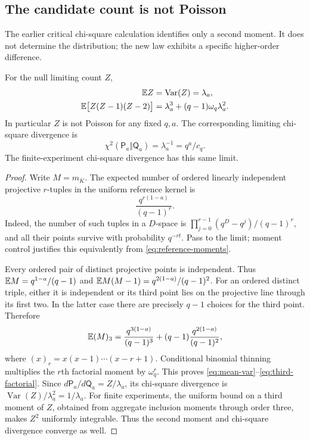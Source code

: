 \subsection{The candidate count is not Poisson}

The earlier critical chi-square calculation identifies only a second
moment. It does not determine the distribution; the new law exhibits a
specific higher-order difference.

\begin{corollary}
\label{cor:not-poisson}
For the null limiting count $Z$,
\begin{align}
 \mathbb E Z&=\operatorname{Var}(Z)=\lambda_a,\label{eq:mean-var}\\
 \mathbb E\bigl[Z(Z-1)(Z-2)\bigr]
 &=\lambda_a^3+(q-1)\omega_q\lambda_a^2.
 \label{eq:third-factorial}
\end{align}
In particular $Z$ is not Poisson for any fixed $q,a$. The corresponding
limiting chi-square divergence is
\begin{equation}
 \chi^2(\mathsf P_a\Vert\mathsf Q_a)=\lambda_a^{-1}=q^a/c_q.
 \label{eq:chi}
\end{equation}
The finite-experiment chi-square divergence has this same limit.
\end{corollary}

\begin{proof}
Write $M=m_K$. The expected number of ordered linearly independent
projective $r$-tuples in the uniform reference kernel is
\begin{equation}
 \frac{q^{r(1-a)}}{(q-1)^r}.
 \label{eq:independent-points}
\end{equation}
Indeed, the number of such tuples in a $D$-space is
$\prod_{j=0}^{r-1}(q^D-q^j)/(q-1)^r$, and all their points survive
with probability $q^{-rt}$. Pass to the limit; moment control justifies
this equivalently from \eqref{eq:reference-moments}.

Every ordered pair of distinct projective points is independent. Thus
$\mathbb E M=q^{1-a}/(q-1)$ and
$\mathbb E M(M-1)=q^{2(1-a)}/(q-1)^2$. For an ordered distinct triple,
either it is independent or its third point lies on the projective line
through its first two. In the latter case there are precisely $q-1$
choices for the third point. Therefore
\[
 \mathbb E(M)_3=\frac{q^{3(1-a)}}{(q-1)^3}
 +(q-1)\frac{q^{2(1-a)}}{(q-1)^2},
\]
where $(x)_r=x(x-1)\cdots(x-r+1)$. Conditional binomial thinning
multiplies the $r$th factorial moment by $\omega_q^r$. This proves
\eqref{eq:mean-var}--\eqref{eq:third-factorial}. Since
$d\mathsf P_a/d\mathsf Q_a=Z/\lambda_a$, its chi-square divergence
is $\operatorname{Var}(Z)/\lambda_a^2=1/\lambda_a$.
For finite experiments, the uniform bound on a third moment of $Z$,
obtained from aggregate inclusion moments through order three, makes
$Z^2$ uniformly integrable. Thus the second moment and chi-square
divergence converge as well.
\end{proof}


